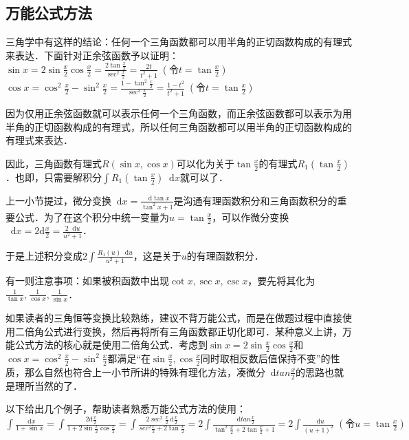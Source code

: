 \documentclass{ctexbook}
\newcommand*{\dif}{\mathop{}\!\mathrm{d}}
\begin{document}
\subsection{万能公式方法}
三角学中有这样的结论：任何一个三角函数都可以用半角的正切函数构成的有理式来表达．下面针对正余弦函数予以证明：\\
$\sin{x}=2\sin{\frac{x}{2}}\cos{\frac{x}{2}}=\frac{2\tan{\frac{x}{2}}}{\sec^{2}{\frac{x}{2}}}=\frac{2t}{t^{2}+1}\;\left(\text{令}t=\tan{\frac{x}{2}}\right)$\\
$\cos{x}=\cos^{2}{\frac{x}{2}}-\sin^{2}{\frac{x}{2}}=\frac{1-\tan^{2}{\frac{x}{2}}}{\sec^{2}{\frac{x}{2}}}=\frac{1-t^{2}}{t^{2}+1}\;\left(\text{令}t=\tan{\frac{x}{2}}\right)$\par
因为仅用正余弦函数就可以表示任何一个三角函数，而正余弦函数都可以表示为用半角的正切函数构成的有理式，所以任何三角函数都可以用半角的正切函数构成的有理式来表达．\par
因此，三角函数有理式$R\left(\sin{x},\cos{x}\right)$可以化为关于$\tan{\frac{x}{2}}$的有理式$R_{1}\left(\tan{\frac{x}{2}}\right)$．也即，只需要解积分$\int R_{1}\left(\tan{\frac{x}{2}}\right)\dif{x}$就可以了．\par
上一小节提过，微分变换$\dif{x}=\frac{\dif{\tan{x}}}{\tan^{2}{x}+1}$是沟通有理函数积分和三角函数积分的重要公式．为了在这个积分中统一变量为$u=\tan{\frac{x}{2}}$，可以作微分变换$\dif{x}=2\mathrm{d}\frac{x}{2}=\frac{2\dif{u}}{u^{2}+1}$．\par
于是上述积分变成$2\int\frac{R_{1}\left(u\right)\dif{u}}{u^{2}+1}$，这是关于$u$的有理函数积分．\par
有一则注意事项：如果被积函数中出现$\cot{x},\sec{x},\csc{x}$，要先将其化为$\frac{1}{\tan{x}},\frac{1}{\cos{x}},\frac{1}{\sin{x}}$．\par
如果读者的三角恒等变换比较熟练，建议不背万能公式，而是在做题过程中直接使用二倍角公式进行变换，然后再将所有三角函数都正切化即可．某种意义上讲，万能公式方法的核心就是使用二倍角公式．考虑到$\sin{x}=2\sin{\frac{x}{2}}\cos{\frac{x}{2}}$和$\cos{x}=\cos^{2}{\frac{x}{2}}-\sin^{2}{\frac{x}{2}}$都满足“在$\sin{\frac{x}{2}},\cos{\frac{x}{2}}$同时取相反数后值保持不变”的性质，那么自然也符合上一小节所讲的特殊有理化方法，凑微分$\dif{t}an{\frac{x}{2}}$的思路也就是理所当然的了．\par
以下给出几个例子，帮助读者熟悉万能公式方法的使用：\\
$\int\frac{\dif{x}}{1+\sin{x}}=\int\frac{2\mathrm{d}\frac{x}{2}}{1+2\sin{\frac{x}{2}}\cos{\frac{x}{2}}}=\int\frac{2\sec^{2}{\frac{x}{2}}\,\mathrm{d}\frac{x}{2}}{sec^{2}{\frac{x}{2}}+2\tan{\frac{x}{2}}}=2\int\frac{\dif{t}an{\frac{x}{2}}}{\tan^{2}{\frac{x}{2}}+2\tan{\frac{x}{2}}+1}=2\int\frac{\dif{u}}{\left(u+1\right)^{2}}\;\left(\text{令}u=\tan{\frac{x}{2}}\right)$\\
\end{document}
